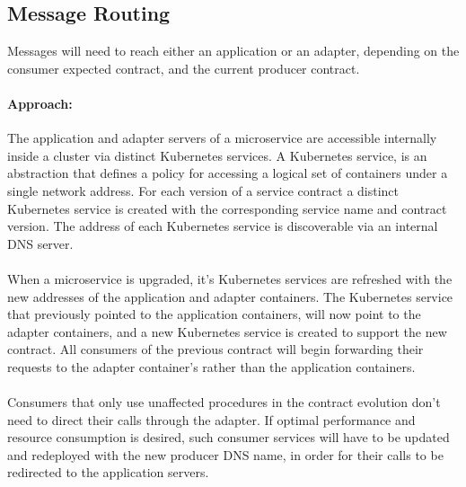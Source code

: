\subsection{Message Routing} %
\label{sec:message_routing}

Messages will need to reach either an application or an adapter, depending on the consumer expected contract, and the current producer contract.

\paragraph{Approach:}
The application and adapter servers of a microservice are accessible internally inside a cluster via distinct Kubernetes services.
A Kubernetes service, is an abstraction that defines a policy for accessing a logical set of containers under a single network address.
For each version of a service contract a distinct Kubernetes service is created with the corresponding service name and contract version.
The address of each Kubernetes service is discoverable via an internal DNS server.

\paragraph{}

When a microservice is upgraded, it's Kubernetes services are refreshed with the new addresses of the application and adapter containers.
The Kubernetes service that previously pointed to the application containers, will now point to the adapter containers, and
a new Kubernetes service is created to support the new contract.
All consumers of the previous contract will begin forwarding their requests to the adapter container's rather than the application containers.

\paragraph{}

Consumers that only use unaffected procedures in the contract evolution don't need to direct their calls through the adapter.
If optimal performance and resource consumption is desired,
such consumer services will have to be updated and redeployed with the new producer DNS name, in order for their calls to be redirected to the application servers.

\paragraph{}

